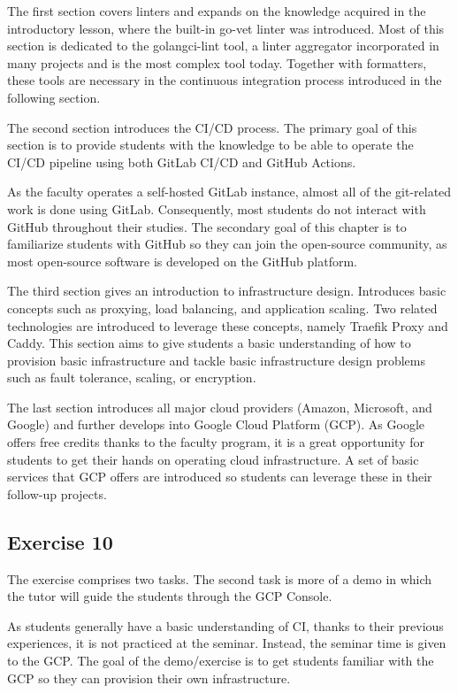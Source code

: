 \documentclass[
  digital,
  color,
  oneside,
  nosansbold,
  nocolorbold,
  lof,
  lot,
]{fithesis4}
\begin{document}
The first section covers linters and expands on the knowledge acquired in the introductory lesson, where the built-in go-vet linter was introduced. Most of this section is dedicated to the golangci-lint tool, a linter aggregator incorporated in many projects and is the most complex tool today. Together with formatters, these tools are necessary in the continuous integration process introduced in the following section.

The second section introduces the CI/CD process. The primary goal of this section is to provide students with the knowledge to be able to operate the CI/CD pipeline using both GitLab CI/CD and GitHub Actions.

As the faculty operates a self-hosted GitLab instance, almost all of the git-related work is done using GitLab. Consequently, most students do not interact with GitHub throughout their studies. The secondary goal of this chapter is to familiarize students with GitHub so they can join the open-source community, as most open-source software is developed on the GitHub platform.

The third section gives an introduction to infrastructure design. Introduces basic concepts such as proxying, load balancing, and application scaling. Two related technologies are introduced to leverage these concepts, namely Traefik Proxy and Caddy. This section aims to give students a basic understanding of how to provision basic infrastructure and tackle basic infrastructure design problems such as fault tolerance, scaling, or encryption.

The last section introduces all major cloud providers (Amazon, Microsoft, and Google) and further develops into Google Cloud Platform (GCP). As Google offers free credits thanks to the faculty program, it is a great opportunity for students to get their hands on operating cloud infrastructure. A set of basic services that GCP offers are introduced so students can leverage these in their follow-up projects.

\subsection{Exercise 10}

The exercise comprises two tasks. The second task is more of a demo in which the tutor will guide the students through the GCP Console.

As students generally have a basic understanding of CI, thanks to their previous experiences, it is not practiced at the seminar. Instead, the seminar time is given to the GCP. The goal of the demo/exercise is to get students familiar with the GCP so they can provision their own infrastructure.
\end{document}
